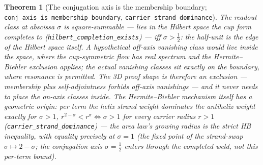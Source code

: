 \documentclass[11pt]{article}
\newtheorem{theorem}[definition]{Theorem}
\newcommand{\code}[1]{\texttt{#1}}
\begin{document}
\begin{theorem}[The conjugation axis is the membership boundary; \code{conj\_axis\_is\_membership\_boundary}, \code{carrier\_strand\_dominance}]\label{thm:membership}
The readout class at abscissa $\sigma$ is square-summable --- lies in the Hilbert space the cup
form completes to (\code{hilbert\_completion\_exists}) --- iff $\sigma>\tfrac12$: the half-unit is
the edge of the Hilbert space itself.  A hypothetical off-axis vanishing class would live
\emph{inside} the space, where the cup-symmetric flow has real spectrum and the Hermite--Biehler
exclusion applies; the actual vanishing classes sit exactly \emph{on} the boundary, where
resonance is permitted.  The 3D proof shape is therefore an exclusion --- membership plus
self-adjointness forbids off-axis vanishings --- and it never needs to place the on-axis
classes inside.  The Hermite--Biehler mechanism itself has a geometric origin: per term the helix
strand weight dominates the antihelix weight exactly for $\sigma>1$,
$r^{2-\sigma}<r^{\sigma}\iff\sigma>1$ for every carrier radius $r>1$
(\code{carrier\_strand\_dominance}) --- the area law's growing radius \emph{is} the strict HB
inequality, with equality precisely at $\sigma=1$ (the fixed point of the strand-swap
$\sigma\mapsto2-\sigma$; the conjugation axis $\sigma=\tfrac12$ enters through the completed weld,
not this per-term bound).
\end{theorem}
\end{document}
